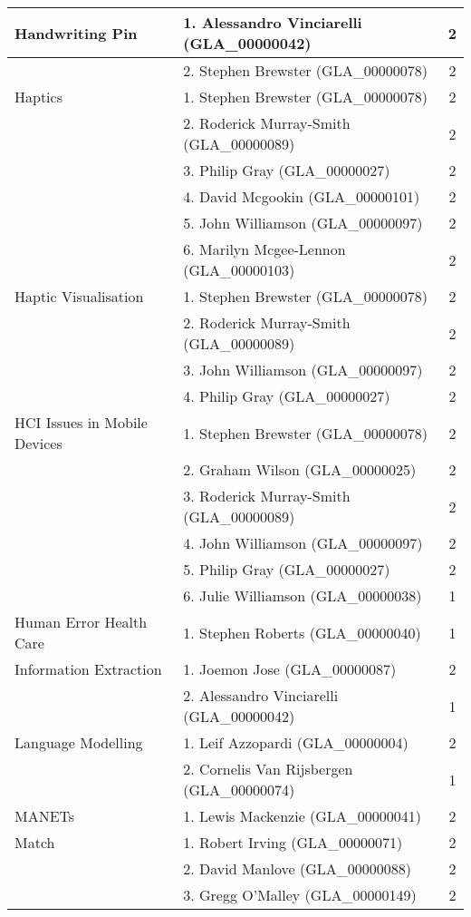 \begin{longtable}{|l|l|c|}
\hline Handwriting Pin & 1. Alessandro Vinciarelli (GLA\_00000042) & 2 \\ 
\hline  & 2. Stephen Brewster (GLA\_00000078) & 2 \\ 
\hline Haptics & 1. Stephen Brewster (GLA\_00000078) & 2 \\ 
\hline  & 2. Roderick Murray-Smith (GLA\_00000089) & 2 \\ 
\hline  & 3. Philip Gray (GLA\_00000027) & 2 \\ 
\hline  & 4. David Mcgookin (GLA\_00000101) & 2 \\ 
\hline  & 5. John Williamson (GLA\_00000097) & 2 \\ 
\hline  & 6. Marilyn Mcgee-Lennon (GLA\_00000103) & 2 \\ 
\hline Haptic Visualisation & 1. Stephen Brewster (GLA\_00000078) & 2 \\ 
\hline  & 2. Roderick Murray-Smith (GLA\_00000089) & 2 \\ 
\hline  & 3. John Williamson (GLA\_00000097) & 2 \\ 
\hline  & 4. Philip Gray (GLA\_00000027) & 2 \\ 
\hline HCI Issues in Mobile Devices & 1. Stephen Brewster (GLA\_00000078) & 2 \\ 
\hline  & 2. Graham Wilson (GLA\_00000025) & 2 \\ 
\hline  & 3. Roderick Murray-Smith (GLA\_00000089) & 2 \\ 
\hline  & 4. John Williamson (GLA\_00000097) & 2 \\ 
\hline  & 5. Philip Gray (GLA\_00000027) & 2 \\ 
\hline  & 6. Julie Williamson (GLA\_00000038) & 1 \\ 
\hline Human Error Health Care & 1. Stephen Roberts (GLA\_00000040) & 1 \\ 
\hline Information Extraction & 1. Joemon Jose (GLA\_00000087) & 2 \\ 
\hline  & 2. Alessandro Vinciarelli (GLA\_00000042) & 1 \\ 
\hline Language Modelling & 1. Leif Azzopardi (GLA\_00000004) & 2 \\ 
\hline  & 2. Cornelis Van Rijsbergen (GLA\_00000074) & 1 \\ 
\hline MANETs & 1. Lewis Mackenzie (GLA\_00000041) & 2 \\ 
\hline Match & 1. Robert Irving (GLA\_00000071) & 2 \\ 
\hline  & 2. David Manlove (GLA\_00000088) & 2 \\ 
\hline  & 3. Gregg O'Malley (GLA\_00000149) & 2 \\ 

\end{longtable}
